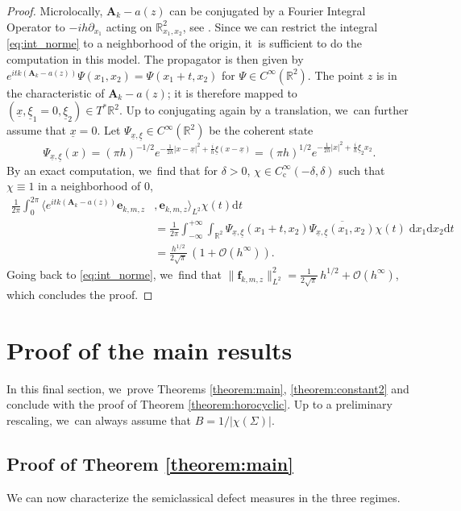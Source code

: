 \documentclass[JEP,XML,SOM,Unicode,published]{cedram}
\newcommand{\bA}{\boldsymbol{A}}
\newcommand{\bme}{\boldsymbol{e}}
\newcommand{\bmf}{\boldsymbol{f}}
\theoremstyle{plain}
\theoremstyle{definition}
\let\con\overline
\let\mc\mathcal
\newcommand{\R}{\mathbb{R}}
\newcommand{\dd}{\mathrm{d}}
\DeclareMathOperator{\comp}{c}
\newcommand{\bigo}{\mathcal{O}}
\begin{document}
\begin{proof}
Microlocally, $\bA_k-a(z)$ can be conjugated by a
Fourier Integral Operator to $-ih\partial_{x_1}$ acting on
$\R^2_{x_1, x_2}$, see \cite[Th.\,12.3]{Zworski-12}. Since we can restrict the integral \eqref{eq:int_norme} to a
neighborhood of the origin, it~is sufficient to do the computation in this
model. The propagator is then given by $e^{itk(\bA_k-a(z))} \Psi (x_1, x_2) = \Psi (x_1 +t, x_2)$ for $\Psi \in C^\infty(\R^2)$. The point $z$ is in the characteristic of $\bA_k-a(z)$; it is therefore mapped to \hbox{$(\underline{x}, \underline{\xi}_1=0,\underline{\xi}_2) \in T^*\R^2$}. Up to conjugating again by a translation, we~can further assume that $\underline{x}=0$. Let
$\Psi_{\underline{x}, \underline{\xi}} \in C^\infty (\R^2)$ be
the coherent state
\[
\Psi_{\underline{x}, \underline{\xi}} (x) = (\pi h)^{-1/2} e^{ -
\frac{1}{2h} | x - \underline{x}|^2 + \frac{i}{h} \underline{\xi} (x - \underline{x}) } = (\pi h)^{1/2}e^{ -
\frac{1}{2h} | x|^2 + \frac{i}{h} \underline{\xi}_2 x_2 }.\]
By an exact computation, we~find that for $\delta > 0$, $\chi \in C^\infty_{{\comp}}(-\delta,\delta)$ such that $\chi \equiv 1$ in a neighborhood of $0$,
\[
\begin{split} \frac{1}{2 \pi } \int_0^{2 \pi } \langle e^{itk(\bA_k-a(z))} \bme_{k,m,z}&,\bme_{k,m,z} \rangle_{L^2} \chi(t)  \dd t \\
& = \frac{1}{2\pi} \int_{-\infty}^{+\infty} \int_{\R^2} \Psi _{ \underline{x},
\underline{\xi} } (x_1 + t, x_2) \con { \Psi_{ \underline{x}, \underline{\xi} } (x_1,
x_2)} \chi(t) \; \dd x_1 \dd x_2 \dd t \\
& = \frac{ h^{1/2}}{2 \sqrt \pi }\,(1+ \mc{O}(h^\infty)).
\end{split}
\]
Going back to \eqref{eq:int_norme}, we~find that $ \|\bmf_{k,m,z}\|^2_{L^2} =
\tfrac{1}{ 2 \sqrt \pi}\, h^{1/2} + \bigo (h^{\infty})$, which
concludes the proof.
\end{proof}

\section{Proof of the main results}

\label{section:proofs}

In this final section, we~prove Theorems \ref{theorem:main}, \ref{theorem:constant2} and conclude with the proof of Theorem \ref{theorem:horocyclic}. Up to a preliminary rescaling, we~can always assume that $B=1/|\chi(\Sigma)|$.

\subsection{Proof of Theorem \ref{theorem:main}} We can now characterize the semiclassical defect measures in the three regimes.
\end{document}
